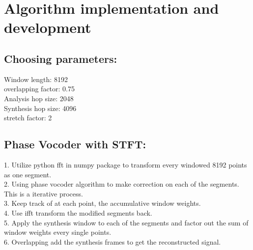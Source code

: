 \documentclass{article}
\begin{document}
\section{Algorithm implementation and development }
\subsection{Choosing parameters:}
Window length: 8192 \\
overlapping factor: 0.75 \\
Analysis hop size: 2048\\
Synthesis hop size: 4096\\
stretch factor: 2
\subsection{Phase Vocoder with STFT: }
1. Utilize python fft in numpy package to transform every windowed 8192 points as one segment.  \\
2. Using phase vocoder algorithm to make correction on each of the segments. This is a iterative process.  \\
3. Keep track of at each point, the accumulative window weights.\\
4. Use ifft transform the modified segments back.\\
5. Apply the synthesis window to each of the segments and factor out the sum of window weights every single points. \\
6. Overlapping add the synthesis frames to get the reconstructed signal.
\end{document}
